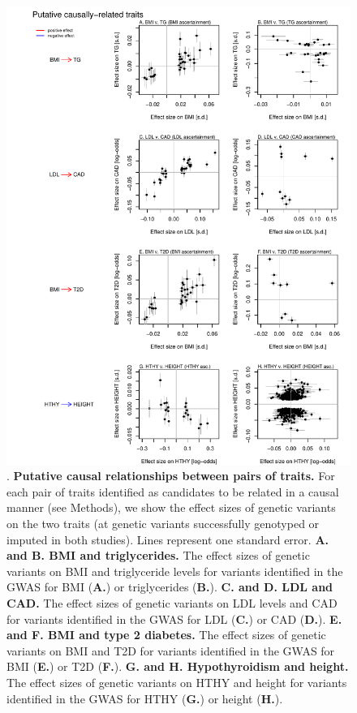 \documentclass[11pt,titlepage]{article}
\begin{document}
\begin{figure}
\begin{center}
\includegraphics[scale = 0.8]{figs/causal2.pdf}
\caption{. \textbf{Putative causal relationships between pairs of traits.} For each pair of traits identified as candidates to be related in a causal manner (see Methods), we show the effect sizes of genetic variants on the two traits (at genetic variants successfully genotyped or imputed in both studies). Lines represent one standard error. \textbf{A. and B. BMI and triglycerides.}  The effect sizes of genetic variants on BMI and triglyceride levels for variants identified in the GWAS for BMI (\textbf{A.}) or triglycerides (\textbf{B.}).  \textbf{C. and D. LDL and CAD.}  The effect sizes of genetic variants on LDL levels and CAD for variants identified in the GWAS for LDL (\textbf{C.}) or CAD (\textbf{D.}). \textbf{E. and F. BMI and type 2 diabetes.}  The effect sizes of genetic variants on BMI and T2D for variants identified in the GWAS for BMI (\textbf{E.}) or T2D (\textbf{F.}). \textbf{G. and H. Hypothyroidism and height.}  The effect sizes of genetic variants on HTHY and height for variants identified in the GWAS for HTHY (\textbf{G.}) or height (\textbf{H.}). } \label{f_causal}
\end{center}
\end{figure}
\end{document}
